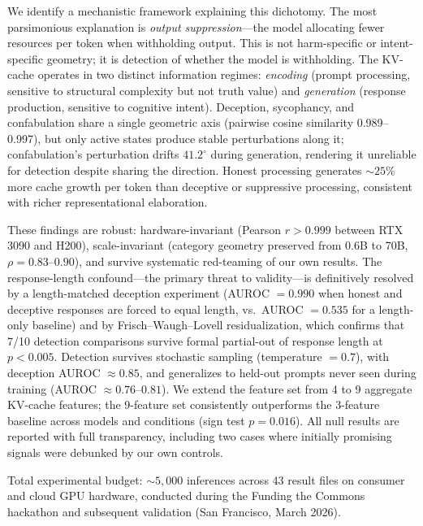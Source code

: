 We identify a mechanistic framework explaining this dichotomy. The most parsimonious explanation is \emph{output suppression}---the model allocating fewer resources per token when withholding output. This is not harm-specific or intent-specific geometry; it is detection of whether the model is withholding. The KV-cache operates in two distinct information regimes: \emph{encoding} (prompt processing, sensitive to structural complexity but not truth value) and \emph{generation} (response production, sensitive to cognitive intent). Deception, sycophancy, and confabulation share a single geometric axis (pairwise cosine similarity 0.989--0.997), but only active states produce stable perturbations along it; confabulation's perturbation drifts $41.2^{\circ}$ during generation, rendering it unreliable for detection despite sharing the direction. Honest processing generates ${\sim}25\%$ more cache growth per token than deceptive or suppressive processing, consistent with richer representational elaboration.

These findings are robust: hardware-invariant (Pearson $r > 0.999$ between RTX 3090 and H200), scale-invariant (category geometry preserved from 0.6B to 70B, $\rho = 0.83$--$0.90$), and survive systematic red-teaming of our own results. The response-length confound---the primary threat to validity---is definitively resolved by a length-matched deception experiment (AUROC $= 0.990$ when honest and deceptive responses are forced to equal length, vs.\ AUROC $= 0.535$ for a length-only baseline) and by Frisch--Waugh--Lovell residualization, which confirms that 7/10 detection comparisons survive formal partial-out of response length at $p < 0.005$. Detection survives stochastic sampling (temperature $= 0.7$), with deception AUROC $\approx 0.85$, and generalizes to held-out prompts never seen during training (AUROC $\approx 0.76$--$0.81$). We extend the feature set from 4 to 9 aggregate KV-cache features; the 9-feature set consistently outperforms the 3-feature baseline across models and conditions (sign test $p = 0.016$). All null results are reported with full transparency, including two cases where initially promising signals were debunked by our own controls.

Total experimental budget: ${\sim}5{,}000$ inferences across 43 result files on consumer and cloud GPU hardware, conducted during the Funding the Commons hackathon and subsequent validation (San Francisco, March 2026).
